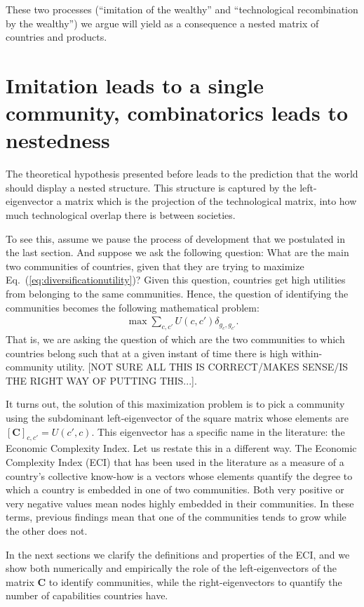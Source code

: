 \documentclass{pnastwo}
\newcommand{\mtx}[1]{\mathbf{ #1}}
\begin{document}
\begin{article}
These two processes (``imitation of the wealthy'' and ``technological recombination by the wealthy'') we argue will yield as a consequence a nested matrix of countries and products.





\section{Imitation leads to a single community, combinatorics leads to nestedness}
The theoretical hypothesis presented before leads to the prediction that the world should display a nested structure. This structure is captured by the left-eigenvector a matrix which is the projection of the technological matrix, into how much technological overlap there is between societies.

To see this, assume we pause the process of development that we postulated in the last section. And suppose we ask the following question: What are the main two communities of countries, given that they are trying to maximize Eq.~(\ref{eq:diversificationutility})? Given this question, countries get high utilities from belonging to the same communities. Hence, the question of identifying the communities becomes the following mathematical problem:
\begin{align}
    \max \sum_{c,c'} U(c, c') \delta_{g_{c}, g_{c'}}.
\end{align}
That is, we are asking the question of which are the two communities to which countries belong such that at a given instant of time there is high within-community utility. [NOT SURE ALL THIS IS CORRECT/MAKES SENSE/IS THE RIGHT WAY OF PUTTING THIS...].

It turns out, the solution of this maximization problem is to pick a community using the subdominant left-eigenvector of the square matrix whose elements are $[\mtx{C}]_{c,c'}= U(c', c)$. This eigenvector has a specific name in the literature: the Economic Complexity Index. Let us restate this in a different way. The Economic Complexity Index (ECI) that has been used in the literature as a measure of a country's collective know-how is a vectors whose elements quantify the degree to which a country is embedded in one of two communities. Both very positive or very negative values mean nodes highly embedded in their communities. In these terms, previous findings mean that one of the communities tends to grow while the other does not. 

In the next sections we clarify the definitions and properties of the ECI, and we show both numerically and empirically the role of the left-eigenvectors of the matrix $\mtx{C}$ to identify communities, while the right-eigenvectors to quantify the number of capabilities countries have.




\end{article}
\end{document}

